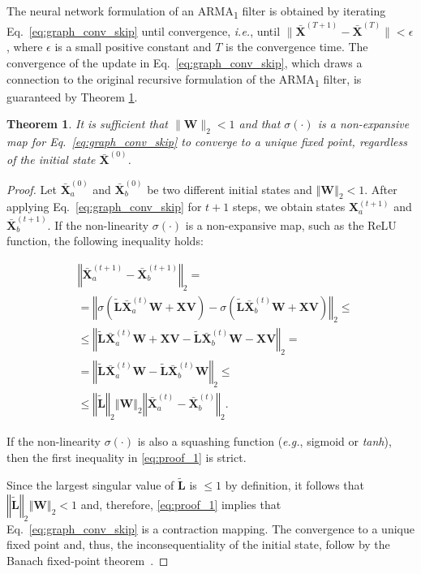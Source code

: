 \documentclass{article}
\def\X{{\mathbf X}}
\def\W{{\mathbf W}}
\def\V{{\mathbf V}}
\def\L{{\mathbf L}}
\def\L{{\mathbf L}}
\newtheorem{theorem}{Theorem}
\begin{document}
The neural network formulation of an ARMA\textsubscript{1} filter is obtained by iterating Eq.~\eqref{eq:graph_conv_skip} until convergence, \emph{i.e.}, until $\| \bar{\X}^{(T+1)} - \bar{\X}^{(T)} \| < \epsilon$, where $\epsilon$ is a small positive constant and $T$ is the convergence time.
The convergence of the update in Eq.~\eqref{eq:graph_conv_skip}, which draws a connection to the original recursive formulation of the ARMA\textsubscript{1} filter, is guaranteed by Theorem \ref{th:1}.

\begin{theorem}
\label{th:1}
It is sufficient that $\| \W \|_2 < 1$ and that $\sigma(\cdot)$ is a non-expansive map for Eq.~\eqref{eq:graph_conv_skip} to converge to a unique fixed point, regardless of the initial state $\bar{\X}^{(0)}$.
\end{theorem}

\begin{proof}
Let $\bar \X_a^{(0)}$ and $\bar \X_b^{(0)}$ be two different initial states and $\left\Vert \W \right\Vert_2 < 1$.
After applying Eq.~\eqref{eq:graph_conv_skip} for $t + 1$ steps, we obtain states $\X_a^{(t + 1)}$ and $\bar \X_b^{(t + 1)}$.
If the non-linearity $\sigma(\cdot)$ is a non-expansive map, such as the ReLU function, the following inequality holds:

\begin{equation}
\label{eq:proof_1}
\begin{aligned}
& \left\Vert \bar \X_a^{(t + 1)} - \bar \X_b^{(t + 1)} \right\Vert_2 = \\
& = \left\Vert \sigma\left(\tilde{\L}\bar{\X}_a^{(t)}\mathbf{W} + \X\V \right) - \sigma\left(\tilde{\L}\bar{\X}_b^{(t)}\mathbf{W} + \X\V\right) \right\Vert_2 \leq \\
& \leq \left\Vert \tilde{\L}\bar{\X}_a^{(t)}\mathbf{W} + \X\V - \tilde{\L}\bar{\X}_b^{(t)}\mathbf{W} - \X\V \right\Vert_2 = \\
& = \left\Vert \tilde{\L}\bar{\X}_a^{(t)}\mathbf{W} - \tilde{\L}\bar{\X}_b^{(t)}\mathbf{W} \right\Vert_2 \leq\\
& \leq \left\Vert \tilde{\L} \right\Vert_2 \left\Vert \W \right\Vert_2 \left\Vert \bar{\X}_a^{(t)} - \bar{\X}_b^{(t)} \right\Vert_2.
\end{aligned}
\end{equation}

If the non-linearity $\sigma(\cdot)$ is also a squashing function (\emph{e.g.}, sigmoid or \textit{tanh}), then the first inequality in \eqref{eq:proof_1} is strict.

Since the largest singular value of $\tilde{\L}$ is $\leq 1$ by definition, it follows that $\left\Vert \tilde{\L} \right\Vert_2 \left\Vert \W \right\Vert_2 < 1$ and, therefore, \eqref{eq:proof_1} implies that Eq.~\eqref{eq:graph_conv_skip} is a contraction mapping.
The convergence to a unique fixed point and, thus, the inconsequentiality of the initial state, follow by the Banach fixed-point theorem~\cite{goebel1972fixed}.
\end{proof}
\end{document}
